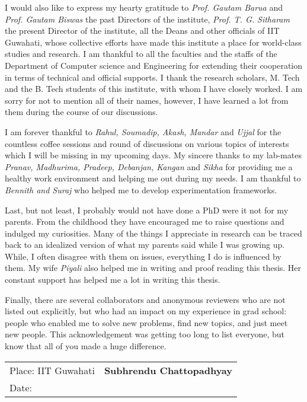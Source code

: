 I would also like to express my hearty gratitude to \textit{Prof. Gautam Barua} and \textit{Prof. Gautam Biswas} the past Directors of the institute,  \textit{Prof. T. G. Sitharam} the present Director of the institute, all the Deans and other officials of IIT Guwahati, whose collective efforts have made this institute a place for world-class studies and research. I am thankful to all the faculties and the staffs of the Department of Computer science and Engineering for extending their cooperation in terms of technical and official supports. I thank the research scholars, M. Tech and the B. Tech students of this institute, with whom I have closely worked. I am sorry for not to mention all of their names, however, I have learned a lot from them during the course of our discussions.


I am forever thankful to \textit{Rahul, Soumadip, Akash, Mandar} and \textit{Ujjal} for the countless coffee sessions and round of discussions on various topics of interests which I will be missing in my upcoming days. My sincere thanks to my lab-mates \textit{Pranav, Madhurima, Pradeep, Debanjan, Kangan} and \textit{Sikha} for providing me a healthy work environment and helping me out during my needs. I am thankful to \textit{Bennith and Suraj} who helped me to develop experimentation frameworks.

Last, but not least, I probably would not have done a PhD were it not for my parents. From the childhood they have encouraged me to raise questions and indulged my curiosities. Many of the things I appreciate in research can be traced back to an idealized version of what my parents said while I was growing up. While, I often disagree with
them on issues, everything I do is influenced by them. My wife \textit{Piyali} also helped me in writing and proof reading this thesis. Her constant support has helped me a lot in writing this thesis.

Finally, there are several collaborators and anonymous reviewers who are not listed out explicitly, but who had an impact on my experience in grad school: people who enabled me to solve new problems, find new topics, and just meet new people. This acknowledgement was getting too long to list everyone, but know that all of you made a huge difference.

\vspace{2cm}
\begin{tabular}{p{}p{}}
Place: IIT Guwahati  & \large{ \centering \textbf{Subhrendu Chattopadhyay}}\\
Date:  & 
\end{tabular}
